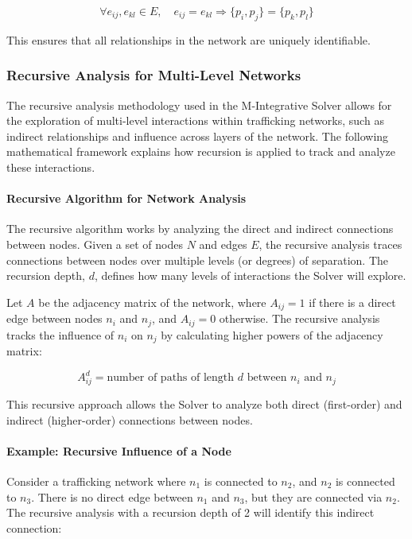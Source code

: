 \documentclass[%
 preprint, linenumbers,
 amsmath,amssymb,
 aps, physrev,
]{revtex4-2}
\begin{document}
\[
\forall e_{ij}, e_{kl} \in E, \quad e_{ij} = e_{kl} \Rightarrow \{p_i, p_j\} = \{p_k, p_l\}
\]

This ensures that all relationships in the network are uniquely identifiable.

\subsubsection*{Recursive Analysis for Multi-Level Networks}

The recursive analysis methodology used in the M-Integrative Solver allows for the exploration of multi-level interactions within trafficking networks, such as indirect relationships and influence across layers of the network. The following mathematical framework explains how recursion is applied to track and analyze these interactions.

\paragraph{Recursive Algorithm for Network Analysis}
The recursive algorithm works by analyzing the direct and indirect connections between nodes. Given a set of nodes \( N \) and edges \( E \), the recursive analysis traces connections between nodes over multiple levels (or degrees) of separation. The recursion depth, \( d \), defines how many levels of interactions the Solver will explore.

Let \( A \) be the adjacency matrix of the network, where \( A_{ij} = 1 \) if there is a direct edge between nodes \( n_i \) and \( n_j \), and \( A_{ij} = 0 \) otherwise. The recursive analysis tracks the influence of \( n_i \) on \( n_j \) by calculating higher powers of the adjacency matrix:

\[
A^d_{ij} = \text{number of paths of length } d \text{ between } n_i \text{ and } n_j
\]

This recursive approach allows the Solver to analyze both direct (first-order) and indirect (higher-order) connections between nodes.

\paragraph{Example: Recursive Influence of a Node}
Consider a trafficking network where \( n_1 \) is connected to \( n_2 \), and \( n_2 \) is connected to \( n_3 \). There is no direct edge between \( n_1 \) and \( n_3 \), but they are connected via \( n_2 \). The recursive analysis with a recursion depth of 2 will identify this indirect connection:
\end{document}
